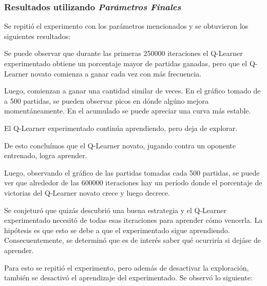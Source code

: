 \subsubsection{Resultados utilizando \emph{Parámetros Finales}}

Se repitió el experimento con los parámetros mencionados y se obtuvieron los siguientes resultados:



Se puede observar que durante las primeras 250000 iteraciones el Q-Learner experimentado obtiene un porcentaje mayor de partidas ganadas, pero que el Q-Learner novato comienza a ganar cada vez con más frecuencia. 

Luego, comienzan a ganar una cantidad similar de veces. En el gráfico tomado de a 500 partidas, se pueden observar picos en dónde algúno mejora momentáneamente. En el acumulado se puede apreciar una curva más estable. 

El Q-Learner experimentado continúa aprendiendo, pero deja de explorar. 

De esto concluímos que el Q-Learner novato, jugando contra un oponente entrenado, logra aprender.

Luego, observando el gráfico de las partidas tomadas cada 500 partidas, se puede ver que alrededor de las 600000 iteraciones hay un período donde el porcentaje de victorias del Q-Learner novato crece y luego decrece. 

Se conjeturó que quizás descubrió una buena estrategia y el Q-Learner experimentado necesitó de todas esas iteraciones para aprender cómo vencerla. La hipótesis es que esto se debe a que el experimentado sigue aprendiendo. 
Consecuentemente, se determinó que es de interés saber qué ocurriría si dejáse de aprender.

Para esto se repitió el experimento, pero además de desactivar la exploración, también se desactivó el aprendizaje del experimentado. Se observó lo siguiente:



